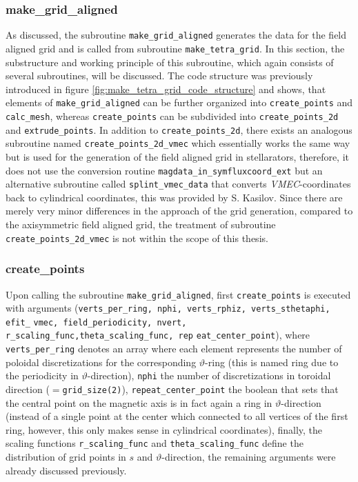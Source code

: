 \documentclass[./main.tex]{subfiles}
\begin{document}
\subsubsection{make\_grid\_aligned}
As discussed, the subroutine \texttt{make\_grid\_aligned} generates the data for the field aligned grid and is called from subroutine \texttt{make\_tetra\_grid}. In this section, the substructure and working principle of this subroutine, which again consists of several subroutines, will be discussed. The code structure was previously introduced in figure \ref{fig:make_tetra_grid_code_structure} and shows, that elements of \texttt{make\_grid\_aligned} can be further organized into \texttt{create\_points} and \texttt{calc\_mesh}, whereas \texttt{create\_points} can be subdivided into \texttt{create\_points\_2d} and \texttt{extrude\_points}. In addition to \texttt{create\_points\_2d}, there exists an analogous subroutine named \texttt{create\_points\_2d\_vmec} which essentially works the same way but is used for the generation of the field aligned grid in stellarators, therefore, it does not use the conversion routine \texttt{magdata\_in\_symfluxcoord\_ext} but an alternative subroutine called \texttt{splint\_vmec\_data} that converts \textit{VMEC}-coordinates back to cylindrical coordinates, this was provided by S. Kasilov. Since there are merely very minor differences in the approach of the grid generation, compared to the axisymmetric field aligned grid, the treatment of subroutine \texttt{create\_points\_2d\_vmec} is not within the scope of this thesis.
\subsubsection{create\_points}
Upon calling the subroutine \texttt{make\_grid\_aligned}, first \texttt{create\_points} is executed with arguments (\texttt{verts\_per\_ring, nphi, verts\_rphiz, verts\_sthetaphi, efit\_}
\texttt{vmec, field\_periodicity, nvert, r\_scaling\_func,theta\_scaling\_func, rep}\newline
\texttt{eat\_center\_point}), where \texttt{verts\_per\_ring} denotes an array where each element represents the number of poloidal discretizations for the corresponding $\vartheta$-ring (this is named ring due to the periodicity in $\vartheta$-direction), \texttt{nphi} the number of discretizations in toroidal direction ($=$\texttt{grid\_size(2)}), \texttt{repeat\_center\_point} the boolean that sets that the central point on the magnetic axis is in fact again a ring in $\vartheta$-direction (instead of a single point at the center which connected to all vertices of the first ring, however, this only makes sense in cylindrical coordinates), finally, the scaling functions \texttt{r\_scaling\_func} and \texttt{theta\_scaling\_func} define the distribution of grid points in $s$ and $\vartheta$-direction, the remaining arguments were already discussed previously. \\
\end{document}
